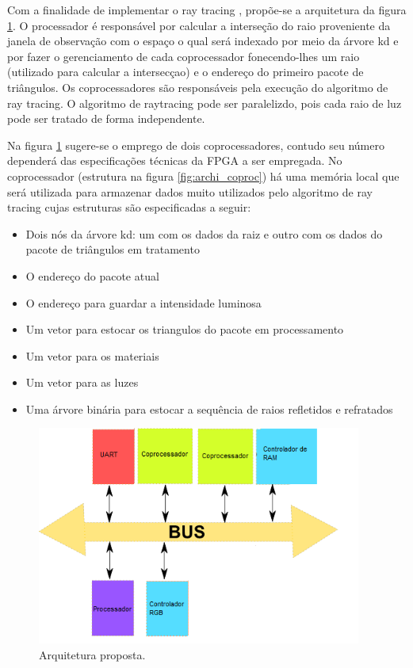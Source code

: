 \documentclass[a4paper,12pt]{article}
\begin{document}
Com a finalidade de implementar o ray tracing , propõe-se a arquitetura da figura \ref{fig:archi_general}. O processador é responsável por calcular a interseção do raio proveniente da janela de observação com o espaço o qual será indexado por meio da árvore kd e por fazer o gerenciamento de cada coprocessador fonecendo-lhes um raio (utilizado para calcular a intersecçao) e o endereço do primeiro pacote de triângulos. Os coprocessadores são responsáveis pela execução do algoritmo de ray tracing. O algoritmo de raytracing pode ser paralelizdo, pois cada raio de luz pode ser tratado de forma independente.

 Na figura \ref{fig:archi_general} sugere-se o emprego de dois coprocessadores, contudo seu número dependerá das especificações técnicas da FPGA a ser empregada. No coprocessador (estrutura na figura \ref{fig:archi_coproc}) há uma memória local que será utilizada para armazenar dados muito utilizados pelo algoritmo de ray tracing cujas estruturas são especificadas a seguir:

\begin{itemize}
\item Dois nós da árvore kd: um com os dados da raiz e outro com os dados do pacote de triângulos em tratamento
\item O endereço do pacote atual
\item O endereço para guardar a intensidade luminosa
\item Um vetor para estocar os triangulos do pacote em processamento
\item Um vetor para os materiais
\item Um vetor para as luzes
\item Uma árvore binária para estocar a sequência de raios refletidos e refratados
\end{itemize}

\begin{figure}[htbp]
  \centering
  \includegraphics[width=0.95\textwidth]{figures/archi_general}
  \caption{Arquitetura proposta.}
  \label{fig:archi_general}
\end{figure}
\end{document}
